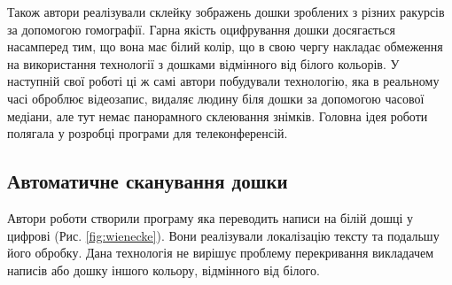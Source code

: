 Також автори реалізували склейку зображень дошки зроблених з різних
ракурсів за допомогою гомографії. Гарна якість оцифрування дошки
досягається насамперед тим, що вона має білий колір, що в свою чергу
накладає обмеження на використання технології з дошками відмінного
від білого кольорів.
У наступній свої роботі \cite{zhang:2007} ці ж самі автори побудували
технологію, яка в реальному часі оброблює відеозапис, видаляє людину біля
дошки за допомогою часової медіани, але тут немає
панорамного склеювання знімків. Головна ідея роботи полягала у розробці
програми для телеконференсій.

\subsection{Автоматичне сканування дошки}

Автори роботи \cite{wienecke} створили програму яка переводить написи на білій
дошці у цифрові (Рис. \ref{fig:wienecke}). Вони реалізували локалізацію тексту та подальшу
його обробку. Дана технологія не вирішує проблему перекривання викладачем написів
або дошку іншого кольору, відмінного від білого.

